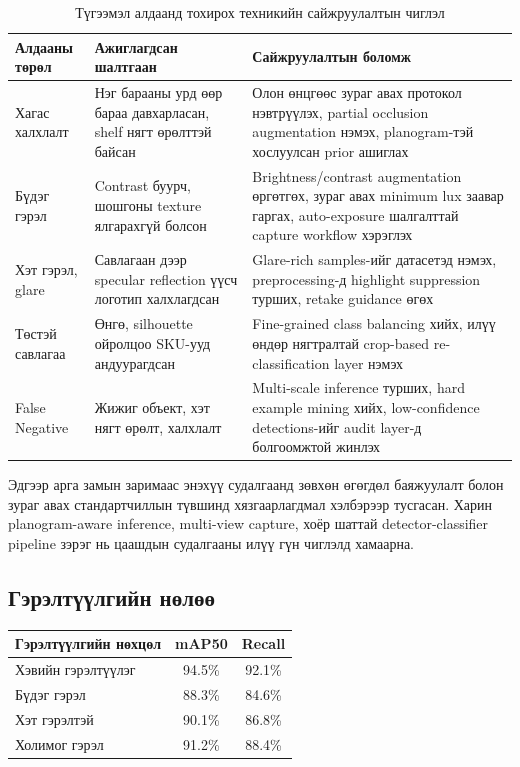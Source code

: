 \begin{longtable}{|p{3.2cm}|p{3.8cm}|p{5.2cm}|}
\caption{Түгээмэл алдаанд тохирох техникийн сайжруулалтын чиглэл}
\label{tab:error_mitigation} \\
\hline
\textbf{Алдааны төрөл} & \textbf{Ажиглагдсан шалтгаан} & \textbf{Сайжруулалтын боломж} \\
\hline
Хагас халхлалт & Нэг барааны урд өөр бараа давхарласан, shelf нягт өрөлттэй байсан & Олон өнцгөөс зураг авах протокол нэвтрүүлэх, partial occlusion augmentation нэмэх, planogram-тэй хослуулсан prior ашиглах \\
\hline
Бүдэг гэрэл & Contrast буурч, шошгоны texture ялгарахгүй болсон & Brightness/contrast augmentation өргөтгөх, зураг авах minimum lux заавар гаргах, auto-exposure шалгалттай capture workflow хэрэглэх \\
\hline
Хэт гэрэл, glare & Савлагаан дээр specular reflection үүсч логотип халхлагдсан & Glare-rich samples-ийг датасетэд нэмэх, preprocessing-д highlight suppression турших, retake guidance өгөх \\
\hline
Төстэй савлагаа & Өнгө, silhouette ойролцоо SKU-ууд андуурагдсан & Fine-grained class balancing хийх, илүү өндөр нягтралтай crop-based re-classification layer нэмэх \\
\hline
False Negative & Жижиг объект, хэт нягт өрөлт, халхлалт & Multi-scale inference турших, hard example mining хийх, low-confidence detections-ийг audit layer-д болгоомжтой жинлэх \\
\hline
\end{longtable}

Эдгээр арга замын заримаас энэхүү судалгаанд зөвхөн өгөгдөл баяжуулалт болон зураг авах стандартчиллын түвшинд хязгаарлагдмал хэлбэрээр тусгасан. Харин planogram-aware inference, multi-view capture, хоёр шаттай detector-classifier pipeline зэрэг нь цаашдын судалгааны илүү гүн чиглэлд хамаарна.

\subsection{Гэрэлтүүлгийн нөлөө}

\begin{table}[H]
\centering
\caption{Гэрэлтүүлгийн нөхцөл дэх нарийвчлал}
\label{tab:lighting_results}
\begin{longtable}{|l|c|c|}
\hline
\textbf{Гэрэлтүүлгийн нөхцөл} & \textbf{mAP50} & \textbf{Recall} \\
\hline
Хэвийн гэрэлтүүлэг & 94.5\% & 92.1\% \\
\hline
Бүдэг гэрэл & 88.3\% & 84.6\% \\
\hline
Хэт гэрэлтэй & 90.1\% & 86.8\% \\
\hline
Холимог гэрэл & 91.2\% & 88.4\% \\
\hline
\end{longtable}
\end{table}

